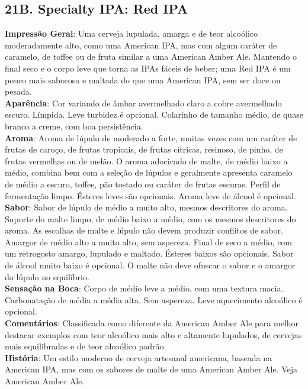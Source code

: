 \subsection*{21B. Specialty IPA: Red IPA}
\textbf{Impressão Geral}: Uma cerveja lupulada, amarga e de teor alcoólico moderadamente alto, como uma American IPA, mas com algum caráter de caramelo, de toffee ou de fruta similar a uma American Amber Ale. Mantendo o final seco e o corpo leve que torna as IPAs fáceis de beber; uma Red IPA é um pouco mais saborosa e maltada do que uma American IPA, sem ser doce ou pesada. \\
\textbf{Aparência}: Cor variando de âmbar avermelhado claro a cobre avermelhado escuro. Límpida. Leve turbidez é opcional. Colarinho de tamanho médio, de quase branco a creme, com boa persistência. \\
\textbf{Aroma}: Aroma de lúpulo de moderado a forte, muitas vezes com um caráter de frutas de caroço, de frutas tropicais, de frutas cítricas, resinoso, de pinho, de frutas vermelhas ou de melão. O aroma adocicado de malte, de médio baixo a médio, combina bem com a seleção de lúpulos e geralmente apresenta caramelo de médio a escuro, toffee, pão tostado ou caráter de frutas escuras. Perfil de fermentação limpo. Ésteres leves são opcionais. Aroma leve de álcool é opcional. \\
\textbf{Sabor}: Sabor de lúpulo de médio a muito alto, mesmos descritores do aroma. Suporte do malte limpo, de médio baixo a médio, com os mesmos descritores do aroma. As escolhas de malte e lúpulo não devem produzir conflitos de sabor. Amargor de médio alto a muito alto, sem aspereza. Final de seco a médio, com um retrogosto amargo, lupulado e maltado. Ésteres baixos são opcionais. Sabor de álcool muito baixo é opcional. O malte não deve ofuscar o sabor e o amargor do lúpulo no equilíbrio. \\
\textbf{Sensação na Boca}: Corpo de médio leve a médio, com uma textura macia. Carbonatação de média a média alta. Sem aspereza. Leve aquecimento alcoólico é opcional. \\
\textbf{Comentários}: Classificada como diferente da American Amber Ale para melhor destacar exemplos com teor alcoólico mais alto e altamente lupulados, de cervejas mais equilibradas e de teor alcoólico padrão. \\
\textbf{História}: Um estilo moderno de cerveja artesanal americana, baseada na American IPA, mas com os sabores de malte de uma American Amber Ale. Veja American Amber Ale. \\
